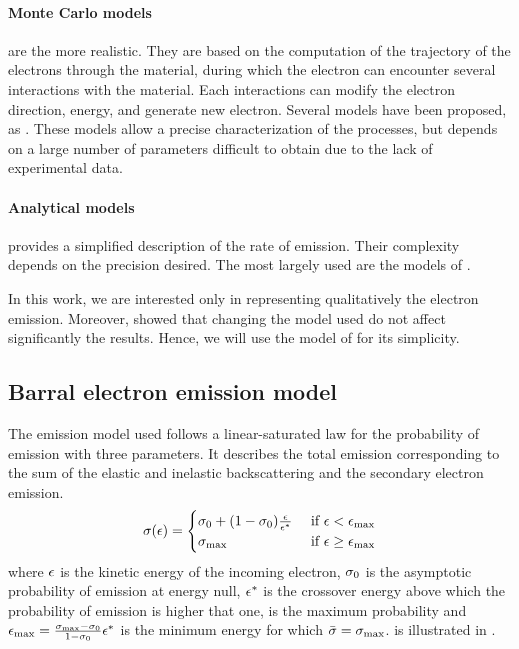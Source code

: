 \paragraph{Monte Carlo models} are the more realistic.
 They are based on the computation of the trajectory of the electrons through the material, during which the electron can encounter several interactions with the material.
 Each interactions can modify the electron direction, energy, and generate new electron.
 Several models have been proposed, as \citet{furman2002,pierron2017}.
 These models allow a precise characterization of the processes, but depends on a large number of parameters difficult to obtain due to the lack of experimental data.
 
\paragraph{Analytical models} provides a simplified description of the rate of emission.
Their complexity depends on the precision desired.
The most largely used are the models of \citet{vaughan1989,barral2003a,sydorenko2006b}.

In this work, we are interested only in representing qualitatively the electron emission.
Moreover, \citet{croes2017} showed that changing the model used do not affect significantly the results. 
Hence, we will use the model of \citet{barral2003a} for its simplicity.

\subsection{Barral electron emission model}
\label{sec-modelused}

The emission model used follows a linear-saturated law for the probability of emission with three parameters. 
It describes the total emission corresponding to the sum of the elastic and inelastic backscattering and the secondary electron emission.
\begin{equation} \label{eq-proba_barral}
  \sigma (\epsilon) = 
  \begin{cases}
    \sigma _0 + (1 - \sigma _0) \frac{\epsilon}{\epsilon^{*}}   &\text{ if } \epsilon <  \epsilon_{\max} \\
    \sigma _{\rm max}  &\text{ if } \epsilon \geq \epsilon_{\max}
  \end{cases}
\end{equation}
where $\epsilon$ is the kinetic energy of the incoming electron, $\sigma _0$ is the asymptotic probability of emission at energy null, $\epsilon^{*}$ is the crossover energy above which the probability of emission is higher that one, \probamax is the maximum probability and $\epsilon_{\max}= \frac{\sigma _{\rm max}  - \sigma _0}{1 - \sigma _0} \epsilon^{*} $ is the minimum energy for which $ \bar{\sigma } = \sigma _{\rm max} $.
 is illustrated in .

